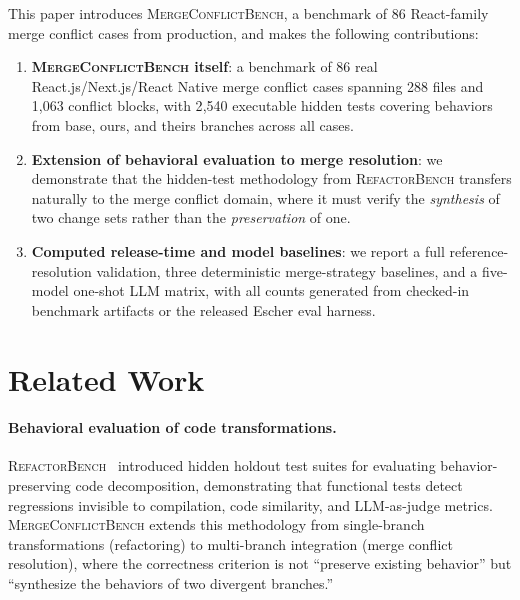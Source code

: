 \documentclass[11pt,letterpaper]{article}
\begin{document}
This paper introduces \textsc{MergeConflictBench}, a benchmark of 86 React-family merge conflict cases from production, and makes the following contributions:

\begin{enumerate}[leftmargin=2em]
\item \textbf{\textsc{MergeConflictBench} itself}: a benchmark of 86 real React.js/Next.js/React Native merge conflict cases spanning 288 files and 1{,}063 conflict blocks, with 2{,}540 executable hidden tests covering behaviors from base, ours, and theirs branches across all cases.

\item \textbf{Extension of behavioral evaluation to merge resolution}: we demonstrate that the hidden-test methodology from \textsc{RefactorBench} transfers naturally to the merge conflict domain, where it must verify the \emph{synthesis} of two change sets rather than the \emph{preservation} of one.

\item \textbf{Computed release-time and model baselines}: we report a full reference-resolution validation, three deterministic merge-strategy baselines, and a five-model one-shot LLM matrix, with all counts generated from checked-in benchmark artifacts or the released Escher eval harness.
\end{enumerate}

\section{Related Work}
\label{sec:related}

\paragraph{Behavioral evaluation of code transformations.} \textsc{RefactorBench}~\citep{chen2025refactorbench} introduced hidden holdout test suites for evaluating behavior-preserving code decomposition, demonstrating that functional tests detect regressions invisible to compilation, code similarity, and LLM-as-judge metrics. \textsc{MergeConflictBench} extends this methodology from single-branch transformations (refactoring) to multi-branch integration (merge conflict resolution), where the correctness criterion is not ``preserve existing behavior'' but ``synthesize the behaviors of two divergent branches.''
\end{document}
